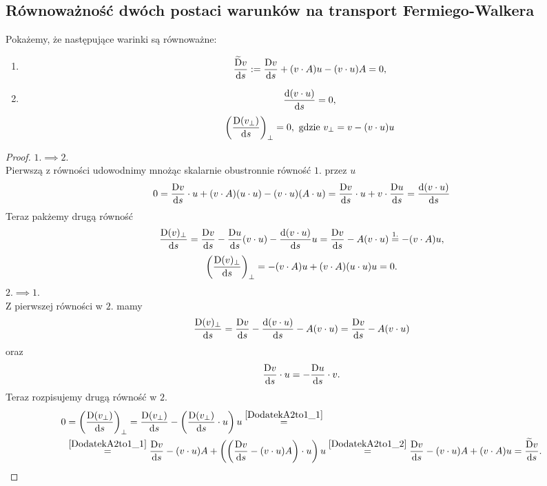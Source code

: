 \subsection{Równoważność dwóch postaci warunków na transport 
Fermiego-Walkera}
Pokażemy, że następujące warinki są równoważne:
\begin{enumerate}
\item
\begin{align} 
\frac{\widetilde{\text{D}} v}{\text{d} s}  : = \frac{\text{D} v}{\text{d} s} +
(v\cdot A) u - (v\cdot u) A = 0,
\end{align}
\item
\begin{align}
\frac{\text{d} (v \cdot u)}{\text{d} s}=0,
\end{align}
\begin{align}
\left(\frac{\text{D} (v_\perp)}{\text{d} s}\right)_\perp = 0, 
\text{ gdzie } v_\perp = v-(v\cdot u)u 
\end{align}
\end{enumerate}
\begin{proof}
$1. \implies 2.$\\
Pierwszą z równości udowodnimy mnożąc skalarnie obustronnie 
równość $1.$ przez $u$
\begin{align}
0 = \frac{\text{D} v}{\text{d} s} \cdot u + ( v\cdot A ) (u\cdot u) - (v\cdot u)(A\cdot u)
=\frac{\text{D} v}{\text{d} s} \cdot u + v\cdot \frac{\text{D} u }{\text{d} s} =
\frac{\text{d} (v \cdot u)}{\text{d} s}
\end{align}
Teraz pakżemy drugą równość
\begin{align}
\frac{\text{D} (v)_\perp }{\text{d} s}=
\frac{\text{D} v}{\text{d} s} - \frac{\text{D} u}{\text{d} s}(v\cdot u) - \frac{\text{d} (v\cdot u)}{\text{d} s} u
= \frac{\text{D} v}{\text{d} s} - A (v \cdot u)  \stackrel{1.}{=}  -(v\cdot A)u,
\end{align}
\begin{align}
\left( \frac{\text{D} (v)_\perp }{\text{d} s}\right)_\perp=
 -(v\cdot A)u  + (v\cdot A) (u\cdot u) u = 0.
\end{align}
$2. \implies 1.$\\
Z pierwszej równości w $2.$ mamy
\begin{align}\label{DodatekA2to1_1}
\frac{\text{D} (v)_\perp}{\text{d} s}=  \frac{\text{D} v}{\text{d} s} -\frac{\text{d} (v\cdot u)}{\text{d} s}
 - A(v\cdot u) 
=  \frac{\text{D} v}{\text{d} s}  - A(v\cdot u) 
\end{align}
oraz
\begin{align}\label{DodatekA2to1_2}
\frac{\text{D} v}{\text{d} s}\cdot u = - \frac{\text{D} u}{\text{d} s} \cdot v.
\end{align}
Teraz rozpisujemy drugą równość w $2.$
\begin{align}
0 &= \left(\frac{\text{D} (v_\perp)}{\text{d} s}\right)_\perp = 
\frac{\text{D} (v_\perp)}{\text{d} s} - 
\left(\frac{\text{D} (v_\perp)}{\text{d} s}\cdot u \right)u 
\stackrel{\eqref{DodatekA2to1_1}}{=} \\ &
\stackrel{\eqref{DodatekA2to1_1}}{=} 
\frac{\text{D} v}{\text{d} s} - (v\cdot u)A + 
\left( \left( \frac{\text{D} v}{\text{d} s} - (v\cdot u)A \right)\cdot u \right)u
\stackrel{\eqref{DodatekA2to1_2}}{=} 
\frac{\text{D} v}{\text{d} s} - (v\cdot u)A + (v\cdot A) u = 
\frac{\widetilde{\text{D}} v}{\text{d} s}  .
\end{align}
\end{proof}
